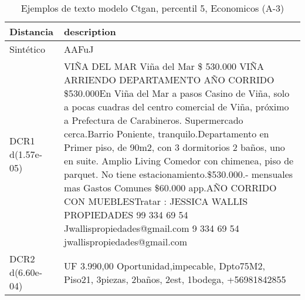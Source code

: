 \begin{table}[H]
\centering
\fontsize{10}{14}\selectfont
\caption{Ejemplos de texto modelo Ctgan, percentil 5, Economicos (A-3)}
\label{table-example-economicos-a-3-ctgan-5p-text}
\begin{tabular}{|l|m{35em}|}
\hline
\rowcolor[gray]{0.8}
Distancia & description \\
\hline Sintético & AAFuJ \\
\hline DCR1 d(1.57e-05) & VI\~NA DEL MAR Vi\~na del Mar \$ 530.000 VI\~NA ARRIENDO DEPARTAMENTO A\~NO CORRIDO \$530.000En Vi\~na del Mar a pasos Casino de Vi\~na, solo a pocas cuadras del centro comercial de Vi\~na, pr\'oximo a Prefectura de Carabineros. Supermercado cerca.Barrio Poniente, tranquilo.Departamento en Primer piso, de 90m2, con 3 dormitorios 2 ba\~nos, uno en suite.  Amplio Living Comedor con chimenea, piso de parquet. No tiene estacionamiento.\$530.000.- mensuales mas Gastos Comunes \$60.000 app.A\~NO CORRIDO CON MUEBLESTratar : JESSICA WALLIS PROPIEDADES         99 334 69 54         Jwallispropiedades@gmail.com 9 334 69 54 jwallispropiedades@gmail.com \\
\hline DCR2 d(6.60e-04) & UF 3.990,00 Oportunidad,impecable, Dpto75M2, Piso21, 3piezas, 2ba\~nos, 2est, 1bodega,  +56981842855 \\
\hline
\end{tabular}
\end{table}
